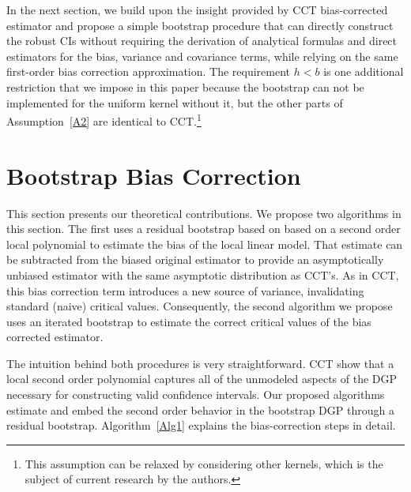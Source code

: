 \documentclass[12pt,fleqn]{article}
\begin{document}
In the next section, we build upon the insight provided by CCT bias-corrected
estimator and propose a simple bootstrap procedure that can directly construct
the robust CIs without requiring the derivation of analytical formulas and
direct estimators for the bias, variance and covariance terms, while relying on
the same first-order bias correction approximation. The requirement $h < b$ is
one additional restriction that we impose in this paper because the bootstrap
can not be implemented for the uniform kernel without it, but the other parts of
Assumption~\ref{A2} are identical to CCT.\footnote{%
  This assumption can be relaxed by considering other kernels, which is the
  subject of current research by the authors.} %

\section{Bootstrap Bias Correction}\label{boot}

This section presents our theoretical contributions. We propose two algorithms
in this section. The first uses a residual bootstrap based on based on a second
order local polynomial to estimate the bias of the local linear model. That
estimate can be subtracted from the biased original estimator to provide an
asymptotically unbiased estimator with the same asymptotic distribution as
CCT's. As in CCT, this bias correction term introduces a new source of variance,
invalidating standard (naive) critical values. Consequently, the second
algorithm we propose uses an iterated bootstrap to estimate the correct
critical values of the bias corrected estimator.

The intuition behind both procedures is very straightforward. CCT show that a
local second order polynomial captures all of the unmodeled aspects of the DGP
necessary for constructing valid confidence intervals. Our proposed algorithms
estimate and embed the second order behavior in the bootstrap DGP through
a residual bootstrap.
Algorithm~\ref{Alg1} explains the bias-correction steps in detail.
\end{document}
